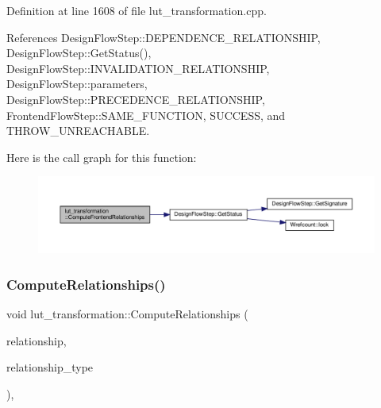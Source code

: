 Definition at line 1608 of file lut\+\_\+transformation.\+cpp.



References Design\+Flow\+Step\+::\+D\+E\+P\+E\+N\+D\+E\+N\+C\+E\+\_\+\+R\+E\+L\+A\+T\+I\+O\+N\+S\+H\+IP, Design\+Flow\+Step\+::\+Get\+Status(), Design\+Flow\+Step\+::\+I\+N\+V\+A\+L\+I\+D\+A\+T\+I\+O\+N\+\_\+\+R\+E\+L\+A\+T\+I\+O\+N\+S\+H\+IP, Design\+Flow\+Step\+::parameters, Design\+Flow\+Step\+::\+P\+R\+E\+C\+E\+D\+E\+N\+C\+E\+\_\+\+R\+E\+L\+A\+T\+I\+O\+N\+S\+H\+IP, Frontend\+Flow\+Step\+::\+S\+A\+M\+E\+\_\+\+F\+U\+N\+C\+T\+I\+ON, S\+U\+C\+C\+E\+SS, and T\+H\+R\+O\+W\+\_\+\+U\+N\+R\+E\+A\+C\+H\+A\+B\+LE.

Here is the call graph for this function\+:
\nopagebreak
\begin{figure}[H]
\begin{center}
\leavevmode
\includegraphics[width=350pt]{d4/d19/classlut__transformation_af8ac14b6eaae00e154894fea4626252b_cgraph}
\end{center}
\end{figure}
\mbox{\label{classlut__transformation_a91631c01821c79e4c92f0be5d92af0a4}} 
\subsubsection{\texorpdfstring{Compute\+Relationships()}{ComputeRelationships()}}
{\footnotesize\ttfamily void lut\+\_\+transformation\+::\+Compute\+Relationships (\begin{DoxyParamCaption}\item[{\hyperlink{classDesignFlowStepSet}{Design\+Flow\+Step\+Set} \&}]{relationship,  }\item[{const \hyperlink{classDesignFlowStep_a723a3baf19ff2ceb77bc13e099d0b1b7}{Design\+Flow\+Step\+::\+Relationship\+Type}}]{relationship\+\_\+type }\end{DoxyParamCaption})\hspace{0.3cm}{\ttfamily [override]}, {\ttfamily [virtual]}}



